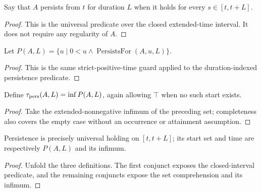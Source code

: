 \begin{definition}
\label{def:hitting:persists-for}
Say that $A$ persists from $t$ for duration $L$ when it holds for every
$s\in[t,t+L]$.
\end{definition}
\begin{proof}

\leanok
This is the universal predicate over the closed extended-time interval.  It
does not require any regularity of $A$.
\end{proof}

\begin{definition}
\label{def:hitting:persistence-times}
Let $P(A,L)=\{u\mid0<u\mathbin{\wedge}\operatorname{PersistsFor}(A,u,L)\}$.
\end{definition}
\begin{proof}

\leanok
This is the same strict-positive-time guard applied to the duration-indexed
persistence predicate.
\end{proof}

\begin{definition}
\label{def:hitting:persistence-time}
Define $\tau_{\rm pers}(A,L)=\inf P(A,L)$, again allowing $\top$ when no
such start exists.
\end{definition}
\begin{proof}

\leanok
Take the extended-nonnegative infimum of the preceding set; completeness also
covers the empty case without an occurrence or attainment assumption.
\end{proof}

\begin{theorem}
\label{thm:hitting:persistence-spec}
Persistence is precisely universal holding on $[t,t+L]$; its start set and
time are respectively $P(A,L)$ and its infimum.
\end{theorem}
\begin{proof}

\leanok
Unfold the three definitions.  The first conjunct exposes the closed-interval
predicate, and the remaining conjuncts expose the set comprehension and its
infimum.
\end{proof}

